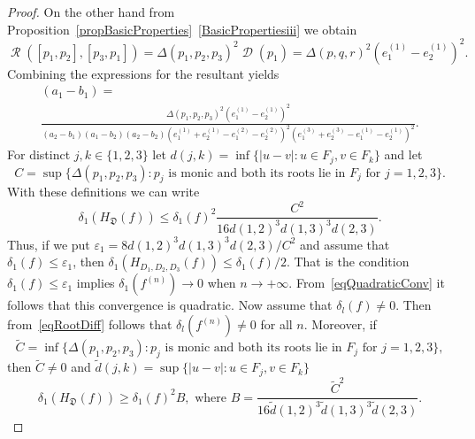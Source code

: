 \documentclass{amsart}
\numberwithin{equation}{section}
\theoremstyle{definition}
\theoremstyle{remark}
\DeclareMathOperator{\Res}{\mathcal R}
\DeclareMathOperator{\Discr}{\mathcal D}
\begin{document}
\begin{proof}
		On the other hand from Proposition~\ref{propBasicProperties}~\ref{BasicPropertiesiii} we obtain
		\[
		\Res([p_1,p_2], [p_3,p_1]) = \Delta(p_1,p_2,p_3)^2\Discr(p_1) = \Delta(p,q,r)^2\left(e_1^{(1)} - e_2^{(1)}\right)^2.
		\]
		Combining the expressions for the resultant yields
		\begin{multline}\label{eqRootDiff}
			(a_1 - b_1) = \\ \frac{\Delta(p_1,p_2,p_3)^2\left(e_1^{(1)} - e_2^{(1)}\right)^2}{(a_2 - b_1)(a_1 - b_2)(a_2 - b_2)\left(e_1^{(1)} + e_2^{(1)} - e_1^{(2)} - e_2^{(2)}\right)^2\left(e_1^{(3)} + e_2^{(3)} - e_1^{(1)} - e_2^{(1)}\right)^2}.
		\end{multline}
		For distinct $j,k \in \{1,2,3\}$ let $d(j,k) = \inf \{|u - v|: u \in F_j, v \in F_k\}$ and let
		\[
		C = \sup\{ \Delta(p_1,p_2,p_3): p_j\text{ is monic and both its roots lie in } F_j\text{ for } j = 1,2,3\}.
		\]
		With these definitions we can write
		\begin{equation}\label{eqQuadraticConv}
			\delta_1(H_{\mathfrak D}(f)) \le \delta_1(f)^2 \frac{C^2}{16d(1,2)^3d(1,3)^3d(2,3)}.
		\end{equation}
		Thus, if we put $\varepsilon_1 =  8d(1,2)^3d(1,3)^3d(2,3)/C^2$ and assume that $\delta_1(f) \le \varepsilon_1$, then $\delta_1(H_{D_1,D_2,D_3}(f)) \le \delta_1(f)/2$. That is the condition $\delta_1(f) \le \varepsilon_1$ implies $\delta_1(f^{(n)}) \to 0$ when $n \to +\infty$. From~\eqref{eqQuadraticConv} it follows that this convergence is quadratic. Now assume that $\delta_l(f) \ne 0$. Then from~\eqref{eqRootDiff} follows that $\delta_l(f^{(n)}) \ne 0$ for all $n$. Moreover, if
		\[
		\tilde C = \inf\{ \Delta(p_1,p_2,p_3): p_j\text{ is monic and both its roots lie in } F_j\text{ for } j = 1,2,3\},
		\]
		then $\tilde C \ne 0$ and $\tilde{d}(j,k) = \sup \{|u - v|: u \in F_j, v \in F_k\}$
		\[
		\delta_1(H_{\mathfrak D}(f)) \ge \delta_1(f)^2 B,\text{ where } B = \frac{\tilde C^2}{16 \tilde d(1,2)^3\tilde d(1,3)^3\tilde d(2,3)}.
		\]

\end{proof}
\end{document}
